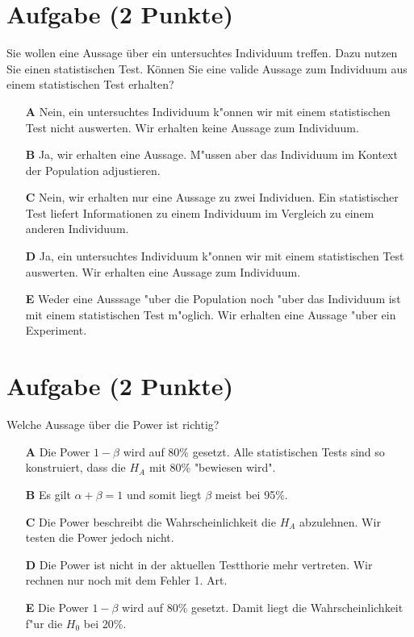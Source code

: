 \documentclass[a4paper, 9pt]{scrartcl}\usepackage[]{graphicx}\usepackage[]{xcolor}
\begin{document}
\section{Aufgabe \hfill (2 Punkte)}



Sie wollen eine Aussage {\"u}ber ein untersuchtes Individuum treffen. Dazu nutzen Sie einen
statistischen Test. K{\"o}nnen Sie eine valide Aussage zum Individuum
aus einem statistischen Test erhalten? 



\begin{enumerate}
\item [\textbf{A} \msquare] Nein, ein untersuchtes Individuum k{"o}nnen wir mit einem statistischen Test nicht auswerten. Wir erhalten keine Aussage zum Individuum.
\item [\textbf{B} \msquare] Ja, wir erhalten eine Aussage. M{"u}ssen aber das Individuum im Kontext der Population adjustieren.
\item [\textbf{C} \msquare] Nein, wir erhalten nur eine Aussage zu zwei Individuen. Ein statistischer Test liefert Informationen zu einem Individuum im Vergleich zu einem anderen Individuum.
\item [\textbf{D} \msquare] Ja, ein untersuchtes Individuum k{"o}nnen wir mit einem statistischen Test auswerten. Wir erhalten eine Aussage zum Individuum.
\item [\textbf{E} \msquare] Weder eine Ausssage {"u}ber die Population noch {"u}ber das Individuum ist mit einem statistischen Test m{"o}glich. Wir erhalten eine Aussage {"u}ber ein Experiment.
\end{enumerate}

\section{Aufgabe \hfill (2 Punkte)}

Welche Aussage {\"u}ber die Power ist richtig?



\begin{enumerate}
\item [\textbf{A} \msquare] Die Power $1-\beta$ wird auf 80\% gesetzt. Alle statistischen Tests sind so konstruiert, dass die $H_A$ mit 80\% "bewiesen wird".
\item [\textbf{B} \msquare] Es gilt $\alpha + \beta = 1$ und somit liegt $\beta$ meist bei 95\%.
\item [\textbf{C} \msquare] Die Power beschreibt die Wahrscheinlichkeit die $H_A$ abzulehnen. Wir testen die Power jedoch nicht.
\item [\textbf{D} \msquare] Die Power ist nicht in der aktuellen Testthorie mehr vertreten. Wir rechnen nur noch mit dem Fehler 1. Art.
\item [\textbf{E} \msquare] Die Power $1-\beta$ wird auf 80\% gesetzt. Damit liegt die Wahrscheinlichkeit f{"u}r die $H_0$ bei 20\%.
\end{enumerate}
\end{document}
